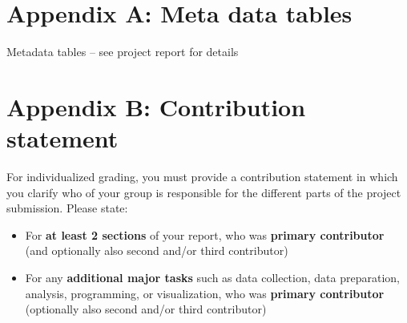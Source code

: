 \documentclass{article}
\begin{document}


\section*{Appendix A: Meta data tables}

Metadata tables – see project report for details

\section*{Appendix B: Contribution statement}

For individualized grading, you must provide a contribution statement in which you clarify who of your group is responsible for the different parts of the project submission. Please state:

\begin{itemize}
    \item For \textbf{at least 2 sections} of your report, who was \textbf{primary contributor} (and optionally also second and/or third contributor)
    \item For any \textbf{additional major tasks} such as data collection, data preparation, analysis, programming, or visualization, who was \textbf{primary contributor} (optionally also second and/or third contributor)  
\end{itemize}
\end{document}
